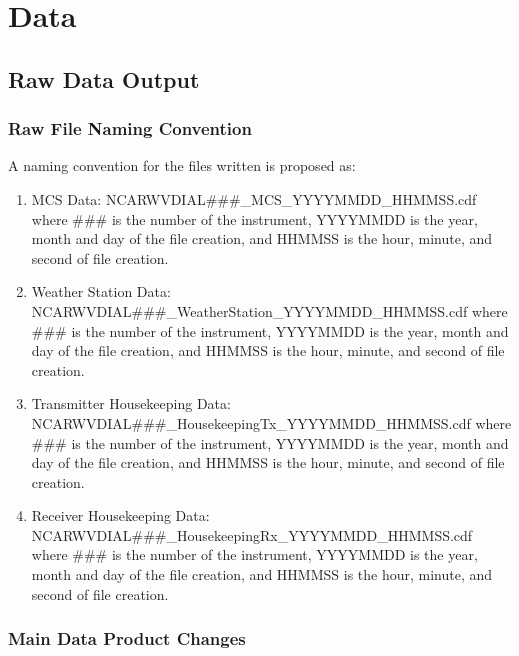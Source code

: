 
\chapter{Data}
\label{CH-Data}

\section{Raw Data Output}
\label{Sec-DATAOutput}

\subsection{Raw File Naming Convention}
 A naming convention for the files written is proposed as:

\begin{enumerate}
\item{MCS Data: NCARWVDIAL\#\#\#\_MCS\_YYYYMMDD\_HHMMSS.cdf where \#\#\# is the number of the instrument, YYYYMMDD is the year, month and day of the file creation, and HHMMSS is the hour, minute, and second of file creation.}
\item{Weather Station Data: NCARWVDIAL\#\#\#\_WeatherStation\_YYYYMMDD\_HHMMSS.cdf where \#\#\# is the number of the instrument, YYYYMMDD is the year, month and day of the file creation, and HHMMSS is the hour, minute, and second of file creation.}
\item{Transmitter Housekeeping Data: NCARWVDIAL\#\#\#\_HousekeepingTx\_YYYYMMDD\_HHMMSS.cdf where \#\#\# is the number of the instrument, YYYYMMDD is the year, month and day of the file creation, and HHMMSS is the hour, minute, and second of file creation.}
\item{Receiver Housekeeping Data: NCARWVDIAL\#\#\#\_HousekeepingRx\_YYYYMMDD\_HHMMSS.cdf where \#\#\# is the number of the instrument, YYYYMMDD is the year, month and day of the file creation, and HHMMSS is the hour, minute, and second of file creation.}
\end{enumerate}

\subsection{Main Data Product Changes}

